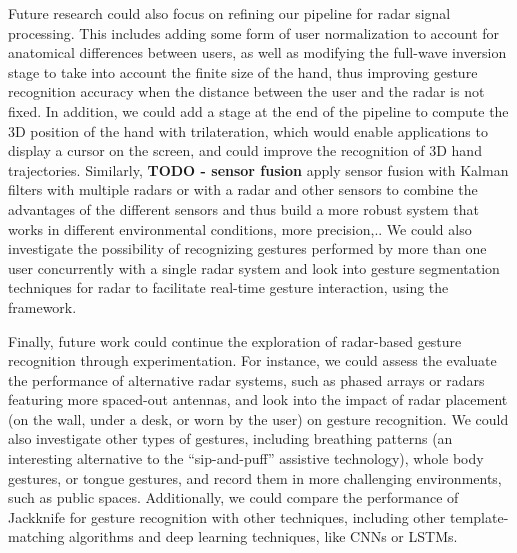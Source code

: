 Future research could also focus on refining our pipeline for radar signal processing.
%
This includes adding some form of user normalization to account for anatomical differences between users, as well as modifying the full-wave inversion stage to take into account the finite size of the hand, thus improving gesture recognition accuracy when the distance between the user and the radar is not fixed.
% 
In addition, we could add a stage at the end of the pipeline to compute the 3D position of the hand with trilateration, which would enable applications to display a cursor on the screen, and could improve the recognition of 3D hand trajectories.
%
Similarly, \textbf{TODO - sensor fusion} apply sensor fusion with Kalman filters with multiple radars or with a radar and other sensors to combine the advantages of the different sensors and thus build a more robust system that works in different environmental conditions, more precision,..
% 
We could also investigate the possibility of recognizing gestures performed by more than one user concurrently with a single radar system and look into gesture segmentation techniques for radar to facilitate real-time gesture interaction, \eg using the \ql framework.



Finally, future work could continue the exploration of radar-based gesture recognition through experimentation.
%
For instance, we could assess the evaluate the performance of alternative radar systems, such as phased arrays or radars featuring more spaced-out antennas, and look into the impact of radar placement (\eg on the wall, under a desk, or worn by the user) on gesture recognition.
%
We could also investigate other types of gestures, including breathing patterns (an interesting alternative to the ``sip-and-puff'' assistive technology), whole body gestures, or tongue gestures, and record them in more challenging environments, such as public spaces.
%
Additionally, we could compare the performance of Jackknife for gesture recognition with other techniques, including other template-matching algorithms and deep learning techniques, like CNNs or LSTMs.
